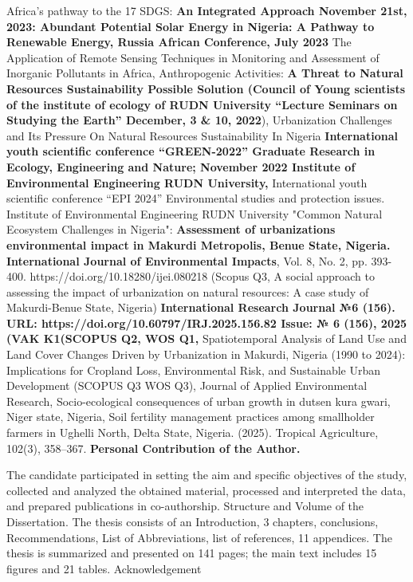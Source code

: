 Africa's pathway to the 17 SDGS: \textbf{An Integrated Approach November 21st, 2023: Abundant Potential Solar Energy in Nigeria: A Pathway to Renewable Energy, Russia African Conference, July 2023} The Application of Remote Sensing Techniques in Monitoring and Assessment of Inorganic Pollutants in Africa, Anthropogenic Activities: \textbf{A Threat to Natural Resources Sustainability Possible Solution (Council of Young scientists of the institute of ecology of RUDN University ``Lecture Seminars on Studying the Earth'' December, 3 \& 10, 2022}), Urbanization Challenges and Its Pressure On Natural Resources Sustainability In Nigeria \textbf{International youth scientific conference ``GREEN-2022'' Graduate Research in Ecology, Engineering and Nature; November 2022 Institute of Environmental Engineering RUDN University,} International youth scientific conference ``EPI 2024'' Environmental studies and protection issues. Institute of Environmental Engineering RUDN University "Common Natural Ecosystem Challenges in Nigeria": \textbf{Assessment of urbanization\textquotesingle s environmental impact in Makurdi Metropolis, Benue State, Nigeria. International Journal of Environmental Impacts}, Vol. 8, No. 2, pp. 393-400. https://doi.org/10.18280/ijei.080218 (Scopus Q3, A social approach to assessing the impact of urbanization on natural resources: A case study of Makurdi-Benue State, Nigeria) \textbf{International Research Journal №6 (156). URL: https://doi.org/10.60797/IRJ.2025.156.82 Issue: № 6 (156), 2025 (VAK K1(SCOPUS Q2, WOS Q1,} Spatiotemporal Analysis of Land Use and Land Cover Changes Driven by Urbanization in Makurdi, Nigeria (1990 to 2024): Implications for Cropland Loss, Environmental Risk, and Sustainable Urban Development (SCOPUS Q3 WOS Q3), Journal of Applied Environmental Research, Socio-ecological consequences of urban growth in dutsen kura gwari, Niger state, Nigeria, Soil fertility management practices among smallholder farmers in Ughelli North, Delta State, Nigeria. (2025). Tropical Agriculture, 102(3), 358--367.
{}\textbf{Personal Contribution of the Author.}

The candidate participated in setting the aim and specific objectives of the study, collected and analyzed the obtained material, processed and interpreted the data, and prepared publications in co-authorship.
Structure and Volume of the Dissertation. The thesis consists of an Introduction, 3 chapters, conclusions, Recommendations, List of Abbreviations, list of references, 11 appendices. The thesis is summarized and presented on 141 pages; the main text includes 15 figures and 21 tables.
Acknowledgement

